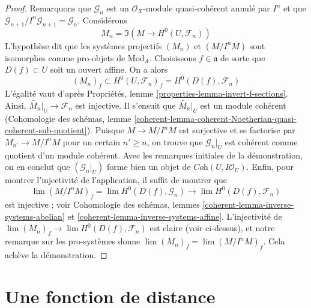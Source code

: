 \begin{proof}
Remarquons que $\mathcal{G}_n$ est un $\mathcal{O}_X$-module quasi-cohérent
annulé par $I^n$ et que
$\mathcal{G}_{n + 1}/I^n\mathcal{G}_{n + 1} = \mathcal{G}_n$.
Considérons
$$
M_n = \Im(M \longrightarrow H^0(U, \mathcal{F}_n))
$$
L'hypothèse dit que les systèmes projectifs $(M_n)$ et
$(M/I^nM)$ sont isomorphes comme pro-objets de $\text{Mod}_A$.
Choisissons $f \in \mathfrak a$ de sorte que $D(f) \subset U$ soit un ouvert affine. On a alors
$$
(M_n)_f \subset H^0(U, \mathcal{F}_n)_f = H^0(D(f), \mathcal{F}_n)
$$
L'égalité vaut d'après Propriétés, lemme \ref{properties-lemma-invert-f-sections}.
Ainsi, $\widetilde{M_n}|_U \to \mathcal{F}_n$ est injective.
Il s'ensuit que $\widetilde{M_n}|_U$ est un module cohérent
(Cohomologie des schémas, lemme
\ref{coherent-lemma-coherent-Noetherian-quasi-coherent-sub-quotient}).
Puisque $M \to M/I^nM$ est surjective et se factorise par
$M_{n'} \to M/I^nM$ pour un certain $n' \geq n$, on trouve que $\mathcal{G}_n|_U$
est cohérent comme quotient d'un module cohérent.
Avec les remarques initiales de la démonstration, on en conclut
que $(\mathcal{G}_n|_U)$ forme bien un objet
de $\textit{Coh}(U, I\mathcal{O}_U)$.
Enfin, pour montrer l'injectivité de l'application,
il suffit de montrer que
$$
\lim (M/I^nM)_f = \lim H^0(D(f), \mathcal{G}_n) \to
\lim H^0(D(f), \mathcal{F}_n)
$$
est injective ; voir Cohomologie des schémas, lemmes
\ref{coherent-lemma-inverse-systems-abelian} et
\ref{coherent-lemma-inverse-systems-affine}.
L'injectivité de $\lim (M_n)_f \to \lim H^0(D(f), \mathcal{F}_n)$
est claire (voir ci-dessus), et notre remarque sur les pro-systèmes donne
$\lim (M_n)_f = \lim (M/I^nM)_f$. Cela achève la démonstration.
\end{proof}





\section{Une fonction de distance}
\label{section-distance}

